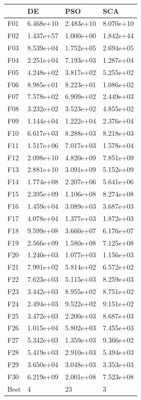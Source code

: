 \begin{tabular}{llll}
\toprule
{} &         DE &        PSO &        SCA \\
\midrule
F01  &  6.468e+10 &  2.483e+10 &  8.070e+10 \\
F02  &  1.437e+57 &  1.000e+00 &  1.842e+44 \\
F03  &  8.539e+04 &  1.752e+05 &  2.694e+05 \\
F04  &  2.251e+04 &  7.193e+03 &  1.287e+04 \\
F05  &  4.248e+02 &  3.817e+02 &  5.255e+02 \\
F06  &  8.985e+01 &  8.223e+01 &  1.086e+02 \\
F07  &  7.578e+02 &  6.909e+02 &  2.449e+03 \\
F08  &  3.232e+02 &  3.523e+02 &  4.855e+02 \\
F09  &  1.144e+04 &  1.222e+04 &  2.376e+04 \\
F10  &  6.617e+03 &  8.288e+03 &  8.218e+03 \\
F11  &  1.517e+06 &  7.017e+03 &  1.578e+04 \\
F12  &  2.098e+10 &  4.820e+09 &  7.851e+09 \\
F13  &  2.881e+10 &  3.091e+09 &  5.152e+09 \\
F14  &  1.774e+08 &  2.207e+06 &  5.641e+06 \\
F15  &  2.395e+09 &  1.106e+08 &  8.274e+08 \\
F16  &  1.459e+04 &  3.089e+03 &  3.687e+03 \\
F17  &  4.078e+04 &  1.377e+03 &  1.872e+03 \\
F18  &  9.599e+08 &  3.660e+07 &  6.176e+07 \\
F19  &  2.566e+09 &  1.580e+08 &  7.125e+08 \\
F20  &  1.240e+03 &  1.077e+03 &  1.156e+03 \\
F21  &  7.991e+02 &  5.814e+02 &  6.572e+02 \\
F22  &  7.623e+03 &  5.115e+03 &  8.259e+03 \\
F23  &  3.442e+03 &  8.955e+02 &  8.751e+02 \\
F24  &  2.494e+03 &  9.522e+02 &  9.151e+02 \\
F25  &  3.472e+03 &  2.200e+03 &  8.687e+03 \\
F26  &  1.015e+04 &  5.802e+03 &  7.455e+03 \\
F27  &  5.342e+03 &  1.359e+03 &  9.366e+02 \\
F28  &  5.419e+03 &  2.910e+03 &  5.494e+03 \\
F29  &  3.650e+04 &  3.048e+03 &  3.353e+03 \\
F30  &  6.219e+09 &  2.001e+08 &  7.523e+08 \\
Best &          4 &         23 &          3 \\
\bottomrule
\end{tabular}
